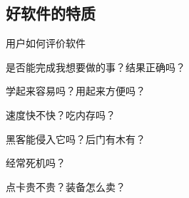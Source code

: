 \subsection{好软件的特质}

\begin{frame}{用户如何评价软件}
  \begin{description}[正确性]
    \item[正确性] 是否能完成我想要做的事？结果正确吗？
      \pause
    \item[易用性] 学起来容易吗？用起来方便吗？
      \pause
    \item[性能] 速度快不快？吃内存吗？
      \pause
    \item[安全性] 黑客能侵入它吗？后门有木有？
      \pause
    \item[稳定性] 经常死机吗？
      \pause
    \item[成本] 点卡贵不贵？装备怎么卖？
  \end{description}
\end{frame}

